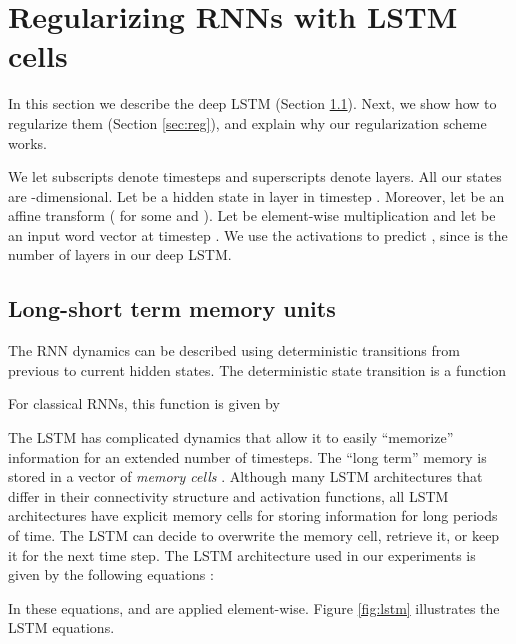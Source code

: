 \documentclass{article}
\begin{document}
\section{Regularizing RNNs with LSTM cells}

In this section we describe the deep LSTM (Section \ref{sec:lstm}). Next, 
we show how to regularize them (Section \ref{sec:reg}), and explain
why our regularization scheme works.

We let subscripts denote timesteps and superscripts denote 
layers.  All our states are -dimensional.  Let  be a hidden state in layer  in timestep
. Moreover, let 
be an affine transform ( for some  and ).
Let  be element-wise multiplication and let  be an
input word vector at timestep .  We use the activations  to predict ,
since  is the number of layers in our deep LSTM.

\subsection{Long-short term memory units}
\label{sec:lstm}

The RNN dynamics can be described using deterministic transitions
from previous to current hidden states. 
The deterministic state transition is a function


For classical RNNs, this function is given by


The LSTM has complicated dynamics that allow it to
easily ``memorize'' information for an extended number of timesteps.  The
``long term'' memory is stored in a vector of \emph{memory cells}
.  Although many LSTM architectures
that differ in their connectivity structure and activation functions,
all LSTM architectures have explicit memory cells for storing
information for long periods of time.  The LSTM can decide
to overwrite the memory cell, retrieve it, or keep it for the next time
step.  The LSTM architecture used in our experiments is given by the
following equations \cite{graves2013speech}:

In these equations,  and  are applied
element-wise. Figure \ref{fig:lstm} illustrates the LSTM
equations.
\end{document}
